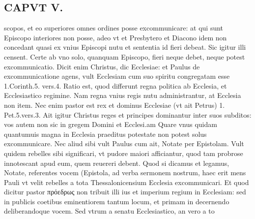 \documentclass{article}
\begin{document}
\begin{pages}
\section*{CAPVT V. }
\marginpar{[ p.393 ]}\pstart scopos, et eo superiores omnes ordines posse excommunicare: at qui sunt Episcopo interiores non posse, adeo vt et Presbytero et Diacono idem non concedant quasi ex vnius Episcopi nutu et sententia id fieri debeat. Sic igitur illi censent. Certe ab vno solo, quanquam Episcopo, fieri neque debet, neque potest excommunicatio. Dicit enim Christus, dic Ecclesiae: et Paulus de excommunicatione agens, vult Ecclesiam cum suo spiritu congregatam esse 1.Corinth.5. vers.4. Ratio est, quod differunt regna politica ab Ecclesia, et Ecclesiastico regimine. Nam regna vnius regis nutu administrantur, at Ecclesia non item. Nec enim pastor est rex et dominus Ecclesiae (vt ait Petrus) 1. Pet.5.vers.3. Ait igitur Christus reges et principes dominantur inter suos subditos: vos autem non sic in gregem Domini et Ecclesi.am Quare vnus quidam quantumuis magna in Ecclesia praeditus potestate non potest solus excommunicare. Nec aliud sibi vult Paulus cum ait, Notate per Epistolam. Vult quidem rebelles sibi significari, vt pudore maiori afficiantur, quod tam probrose innotescant apud eum, quem reuereri debent. Quod si dicamus et legamus, Notate, referentes vocem (Epistola, ad verba sermonem nostrum, haec erit mens Pauli vt velit rebelles a tota Thessalonicensium Ecclesia excommunicari. Et quod dicitur pastor πρόεδρως non tribuit illi ius et imperium regium in Ecclesiam: sed in publicis coetibus eminentiorem tantum locum, et primam in decernendo deliberandoque vocem. Sed vtrum a senatu Ecclesiastico, an vero a to\pend

\end{pages}
\end{document}
